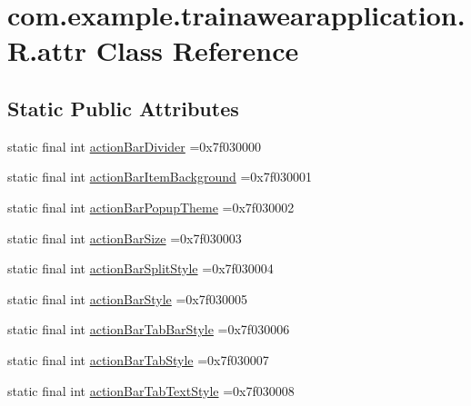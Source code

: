 \hypertarget{classcom_1_1example_1_1trainawearapplication_1_1_r_1_1attr}{}\section{com.\+example.\+trainawearapplication.\+R.\+attr Class Reference}
\label{classcom_1_1example_1_1trainawearapplication_1_1_r_1_1attr}
\subsection*{Static Public Attributes}
\begin{DoxyCompactItemize}
\item 
static final int \mbox{\hyperlink{classcom_1_1example_1_1trainawearapplication_1_1_r_1_1attr_a4c8cb097f6c5df7a666fa452ad9951c0}{action\+Bar\+Divider}} =0x7f030000
\item 
static final int \mbox{\hyperlink{classcom_1_1example_1_1trainawearapplication_1_1_r_1_1attr_adbc2cfb6929283362b19d8ae4b742c11}{action\+Bar\+Item\+Background}} =0x7f030001
\item 
static final int \mbox{\hyperlink{classcom_1_1example_1_1trainawearapplication_1_1_r_1_1attr_a1aebe045b3707e2a4762954d495f164d}{action\+Bar\+Popup\+Theme}} =0x7f030002
\item 
static final int \mbox{\hyperlink{classcom_1_1example_1_1trainawearapplication_1_1_r_1_1attr_a6717c5831d37196ee66ac6fffd2c8da9}{action\+Bar\+Size}} =0x7f030003
\item 
static final int \mbox{\hyperlink{classcom_1_1example_1_1trainawearapplication_1_1_r_1_1attr_a8a2c9ee85e3737411e75f4281ff3ec27}{action\+Bar\+Split\+Style}} =0x7f030004
\item 
static final int \mbox{\hyperlink{classcom_1_1example_1_1trainawearapplication_1_1_r_1_1attr_af10b4287db4998d78c98eeded61b71a4}{action\+Bar\+Style}} =0x7f030005
\item 
static final int \mbox{\hyperlink{classcom_1_1example_1_1trainawearapplication_1_1_r_1_1attr_ac1280dac486d23b7ddebee5cfc6917be}{action\+Bar\+Tab\+Bar\+Style}} =0x7f030006
\item 
static final int \mbox{\hyperlink{classcom_1_1example_1_1trainawearapplication_1_1_r_1_1attr_a99602b55c183de6da2ba3e77333c84b5}{action\+Bar\+Tab\+Style}} =0x7f030007
\item 
static final int \mbox{\hyperlink{classcom_1_1example_1_1trainawearapplication_1_1_r_1_1attr_aaeb460d77caedac38e8c00450759e5b8}{action\+Bar\+Tab\+Text\+Style}} =0x7f030008

\end{DoxyCompactItemize}
